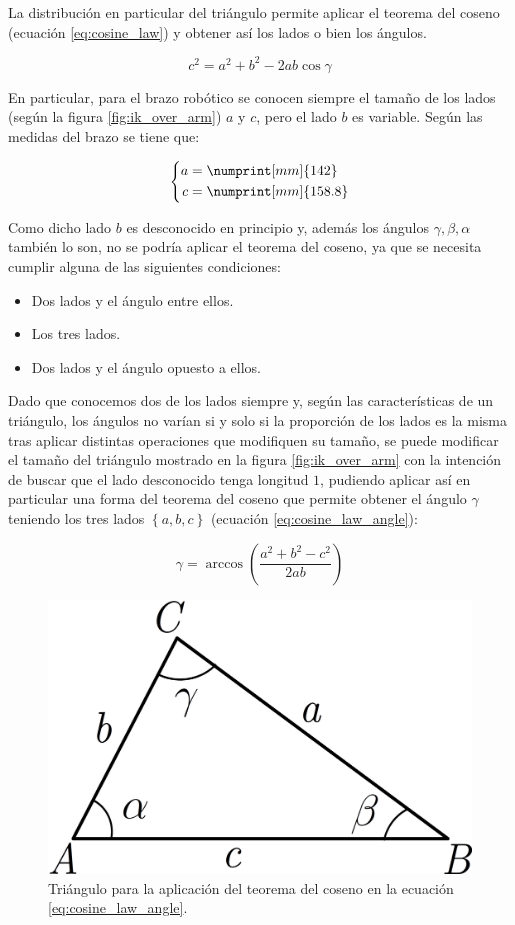 La distribución en particular del triángulo permite aplicar el teorema del coseno (ecuación
\ref{eq:cosine_law}) y obtener así los lados o bien los ángulos.

\begin{equation}\label{eq:cosine_law}
    c^2 = a^2 + b^2 - 2ab\cos{\gamma}
\end{equation}

En particular, para el brazo robótico se conocen siempre el tamaño de los lados
(según la figura \ref{fig:ik_over_arm}) $a$ y $c$, pero el lado $b$ es variable. Según las
medidas del brazo se tiene que:

\begin{equation*}
    \left\{
        \begin{aligned}
            a &= \numprint[mm]{142} \\
            c &= \numprint[mm]{158.8}
        \end{aligned}
    \right.
\end{equation*}

Como dicho lado $b$ es desconocido en principio y, además los ángulos $\gamma, \beta, \alpha$
también lo son, no se podría aplicar el teorema del coseno, ya que se necesita cumplir alguna de las
siguientes condiciones:

\begin{itemize}
    \item Dos lados y el ángulo entre ellos.
    \item Los tres lados.
    \item Dos lados y el ángulo opuesto a ellos.
\end{itemize}

Dado que conocemos dos de los lados siempre y, según las características de un triángulo,
los ángulos no varían si y solo si la proporción de los lados es la misma tras aplicar
distintas operaciones que modifiquen su tamaño, se puede modificar el tamaño del triángulo
mostrado en la figura \ref{fig:ik_over_arm} con la intención de buscar que el lado
desconocido tenga longitud $1$, pudiendo aplicar así en particular una forma del
teorema del coseno que permite obtener el ángulo $\gamma$ teniendo los tres lados $\left\{a,b,c\right\}$
(ecuación \ref{eq:cosine_law_angle}):

\begin{equation}\label{eq:cosine_law_angle}
    \gamma = \arccos{\left(\frac{a^2 + b^2 - c^2}{2ab}\right)}
\end{equation}

\begin{figure}[H]
    \centering
    \includegraphics[width=.3\linewidth]{pictures/cosine_law.png}
    \caption{Triángulo para la aplicación del teorema del coseno en la ecuación \ref{eq:cosine_law_angle}.}
    \label{fig:cosine_law_triangle}
\end{figure}

